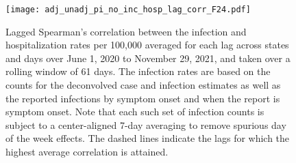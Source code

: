 \begin{figure}[H]
\centering
    \texttt{[image: adj\_unadj\_pi\_no\_inc\_hosp\_lag\_corr\_F24.pdf]} 
    \caption{Lagged Spearman's correlation between the infection and
    hospitalization rates per 100,000 averaged for each lag across \US states
    and days over June 1, 2020 to November 29, 2021, and taken over a rolling
    window of 61 days. The infection rates are based on the counts for the
    deconvolved case and infection estimates as well as the reported infections
    by symptom onset and when the report is symptom onset. Note that each such
    set of infection counts is subject to a center-aligned 7-day averaging to
    remove spurious day of the week effects. The dashed lines indicate the lags
    for which the highest average correlation is attained.}
    \label{fig:abl_lag_cor}
\end{figure}
 